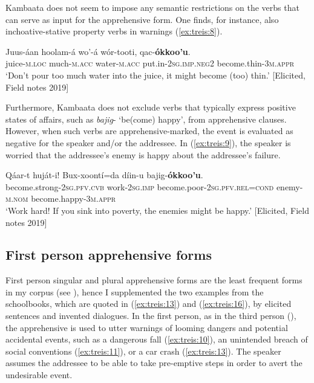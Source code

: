 \documentclass[output=paper,colorlinks,citecolor=brown,
]{langsci/langscibook}
\begin{document}
Kambaata does not seem to impose any semantic restrictions on the verbs that can serve as input for the apprehensive form. One finds, for instance, also inchoative-stative property verbs in warnings (\ref{ex:treis:8}).

\ea\label{ex:treis:8}
\gll Juus-áan		hoolam-á 		wo'-á 			wór-tooti, 				qac-\textbf{ókkoo'u}. \\
juice-\textsc{m.loc}	much-\textsc{m.acc}	water-\textsc{m.acc}	put.in-\textsc{2sg.imp.neg2}	become.thin-\textsc{3m.appr}\\
\glt `Don't pour too much water into the juice, it might become (too) thin.'  [Elicited, Field notes 2019]
\z 

Furthermore, Kambaata does not exclude verbs that typically express positive states of affairs, such as \textit{bajig}- `be(come) happy', from apprehensive clauses. However, when such verbs are apprehensive-marked, the event is evaluated as negative for the speaker and/or the addressee. In (\ref{ex:treis:9}), the speaker is worried that the addressee's enemy is happy about the addressee's failure.

\ea\label{ex:treis:9}
\gll Qáar-t						huját-i! 			Bux-xoontí=da						díin-u bajig-\textbf{ókkoo'u}. \\
become.strong-\textsc{2sg.pfv.cvb}	work-\textsc{2sg.imp}	become.poor-\textsc{2sg.pfv.rel=cond} enemy-\textsc{m.nom} become.happy-\textsc{3m.appr}\\
\glt `Work hard! If you sink into poverty, the enemies might be happy.'  [Elicited, Field notes 2019]
\z 

\subsection{First person apprehensive forms}\label{sec:treis:3.2}

First person singular and plural apprehensive forms are the least frequent forms in my corpus (see ), hence I supplemented the two examples from the schoolbooks, which are quoted in (\ref{ex:treis:13}) and (\ref{ex:treis:16}), by elicited sentences and invented dialogues. In the first person, as in the third person (), the apprehensive is used to utter warnings of looming dangers and potential accidental events, such as a dangerous fall (\ref{ex:treis:10}), an unintended breach of social conventions (\ref{ex:treis:11}), or a car crash (\ref{ex:treis:13}). The speaker assumes the addressee to be able to take pre-emptive steps in order to avert the undesirable event.
\end{document}
